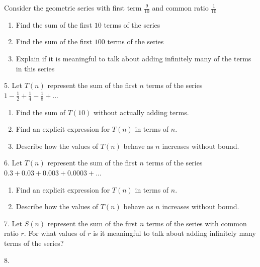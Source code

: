 \documentclass[10pt,]{book}
\theoremstyle{plain}
\theoremstyle{definition}
\theoremstyle{definition}
\theoremstyle{definition}
\numberwithin{equation}{section}
\begin{document}
\begin{exerciselist}
Consider the geometric series with first term \(\frac{9}{10}\) and common ratio \(\frac{1}{10}\)%
\leavevmode%
\begin{enumerate}[label=(\alph*)]
\item\hypertarget{li-74}{}Find the sum of the first \(10\) terms of the series%
\item\hypertarget{li-75}{}Find the sum of the first \(100\) terms of the series%
\item\hypertarget{li-76}{}Explain if it is meaningful to talk about adding infinitely many of the terms in this series%
\end{enumerate}
\par\smallskip
\item[5.]\hypertarget{exercise-36}{}\hypertarget{p-177}{}%
Let \(T(n)\) represent the sum of the first \(n\) terms of the series \(1 - \frac{1}{2} + \frac{1}{4} - \frac{1}{8} + ...\)%
\leavevmode%
\begin{enumerate}[label=(\alph*)]
\item\hypertarget{li-77}{}Find the sum of \(T(10)\) without actually adding terms.%
\item\hypertarget{li-78}{}Find an explicit expression for \(T(n)\) in terms of \(n\).%
\item\hypertarget{li-79}{}Describe how the values of \(T(n)\) behave as \(n\) increases without bound.%
\end{enumerate}
\par\smallskip
\item[6.]\hypertarget{exercise-37}{}\hypertarget{p-178}{}%
Let \(T(n)\) represent the sum of the first \(n\) terms of the series \(0.3 + 0.03 + 0.003 + 0.0003 + ...\)%
\leavevmode%
\begin{enumerate}[label=(\alph*)]
\item\hypertarget{li-80}{}Find an explicit expression for \(T(n)\) in terms of \(n\).%
\item\hypertarget{li-81}{}Describe how the values of \(T(n)\) behave as \(n\) increases without bound.%
\end{enumerate}
\par\smallskip
\item[7.]\hypertarget{exercise-38}{}\hypertarget{p-179}{}%
Let \(S(n)\) represent the sum of the first \(n\) terms of the series with common ratio \(r\). For what values of \(r\) is it meaningful to talk about adding infinitely many terms of the series?%
\par\smallskip
\item[8.]\hypertarget{exercise-39}{}\hypertarget{p-180}{}%

\end{exerciselist}
\end{document}
